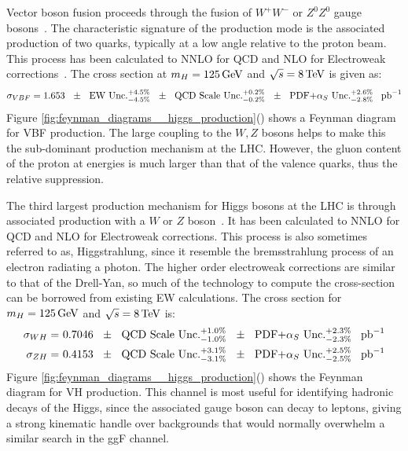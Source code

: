 \par Vector boson fusion proceeds through the fusion of $W^{+}W^{-}$
or $Z^{0}Z^{0}$  gauge bosons~\cite{th:HiggsXS_2013}. The
characteristic signature of the production mode is the associated
production of two quarks, typically at a low angle relative to the
proton beam.  This process has been calculated to NNLO for QCD and NLO
for Electroweak corrections~\cite{th:HiggsXS_2013}.  The cross section
at $m_{H} = 125\,\text{Ge\hspace{-.08em}V}$ and $\sqrt{s}=8\,\text{Te\hspace{-.08em}V}$ is given as:
\begin{equation}\label{eq:vbf_xs}
\sigma_{VBF} = 1.653~~\pm \text{~~EW Unc.}^{+4.5\%}_{-4.5\%}~~\pm
\text{~~QCD Scale Unc.}^{+0.2\%}_{-0.2\%}~~\pm
\text{~~PDF+$\alpha_{S}$ Unc.}^{+2.6\%}_{-2.8\%}~~\mbox{\ensuremath{\,\text{pb}^\text{$-$1}}} 
\end{equation}
\noindent Figure
\ref{fig:feynman_diagrams__higgs_production}()
shows a Feynman diagram for VBF production.  The large coupling to the
$W,Z$ bosons helps to make this the sub-dominant production mechanism
at the LHC.  However, the gluon content of the proton at \TeV energies
is much larger than that of the valence quarks, thus the relative
suppression.  

\par The third largest production mechanism for Higgs bosons at the
LHC is through associated production with a $W$ or $Z$
boson~\cite{th:HiggsXS_2013}.  It has been calculated to NNLO for QCD
and NLO for Electroweak corrections. This process is also sometimes
referred to as, Higgstrahlung, since it resemble the bremsstrahlung
process of an electron radiating a photon. The higher order
electroweak corrections are similar to that of the Drell-Yan, so much
of the technology to compute the cross-section can be borrowed from
existing EW calculations.  The cross section for $m_{H} = 125\,\text{Ge\hspace{-.08em}V}$ and
$\sqrt{s}=8\,\text{Te\hspace{-.08em}V}$ is:  
\begin{equation}\label{eq:vh_xs}
\begin{aligned}
\sigma_{WH} =&~ 0.7046~~\pm \text{~~QCD Scale Unc.}^{+1.0\%}_{-1.0\%}~~\pm
\text{~~PDF+$\alpha_{S}$ Unc.}^{+2.3\%}_{-2.3\%}~~\mbox{\ensuremath{\,\text{pb}^\text{$-$1}}} \\
\sigma_{ZH} =&~ 0.4153~~\pm \text{~~QCD Scale Unc.}^{+3.1\%}_{-3.1\%}~~\pm
\text{~~PDF+$\alpha_{S}$ Unc.}^{+2.5\%}_{-2.5\%}~~\mbox{\ensuremath{\,\text{pb}^\text{$-$1}}} 
\end{aligned}
\end{equation}
\noindent Figure
\ref{fig:feynman_diagrams__higgs_production}()
shows the Feynman diagram for VH production.  This channel is most
useful for identifying hadronic decays of the Higgs, since the
associated gauge boson can decay to leptons, giving a strong kinematic
handle over backgrounds that would normally overwhelm a similar search
in the ggF channel.  


